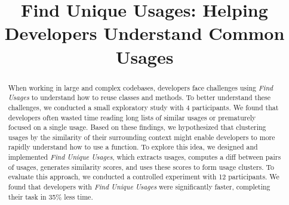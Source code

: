 \documentclass[conference]{IEEEtran}
\begin{document}
\title{Find Unique Usages: Helping Developers Understand Common Usages}




\author{
\and
{}
\and
{}
}

\IEEEoverridecommandlockouts
{}



\maketitle
\IEEEpubidadjcol


\begin{abstract}
When working in large and complex codebases, developers face challenges using \textit{Find Usages} to understand how to reuse classes and methods. To better understand these challenges, we conducted a small exploratory study with 4 participants. We found that developers often wasted time reading long lists of similar usages or prematurely focused on a single usage. Based on these findings, we hypothesized that clustering usages by the similarity of their surrounding context might enable developers to more rapidly understand how to use a function. To explore this idea, we designed and implemented \textit{Find Unique Usages}, which extracts usages, computes a diff between pairs of usages, generates similarity scores, and uses these scores to form usage clusters. To evaluate this approach, we conducted a controlled experiment with 12 participants. We found that developers with \textit{Find Unique Usages} were  significantly  faster,  completing  their  task  in  35\%  less time.
\end{abstract}
\end{document}
